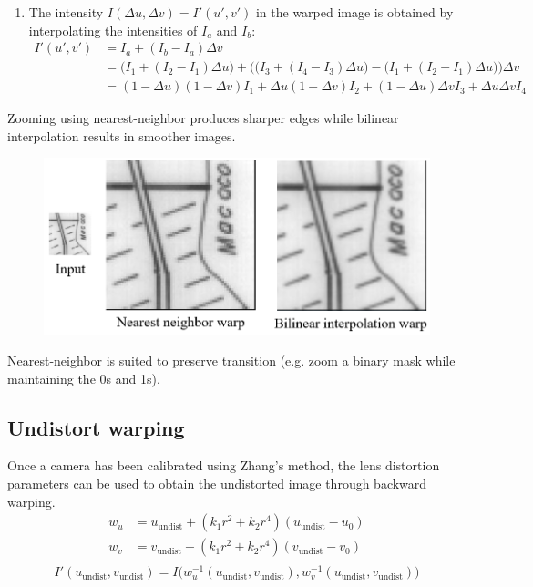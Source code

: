 \begin{description}
\begin{enumerate}
            \item The intensity $I(\Delta u, \Delta v) = I'(u', v')$ in the warped image is obtained by interpolating the intensities of $I_a$ and $I_b$:
                \[ 
                    \begin{split}
                        I'(u', v') &= I_a + (I_b - I_a) \Delta v \\
                        &= \Big( I_1 + (I_2 - I_1) \Delta u \Big) + \Big( \big( I_3 + (I_4 - I_3) \Delta u \big) - \big( I_1 + (I_2 - I_1) \Delta u \big) \Big) \Delta v \\
                        &= (1-\Delta u)(1 - \Delta v) I_1 + \Delta u (1-\Delta v) I_2 + (1-\Delta u) \Delta v I_3 + \Delta u \Delta v I_4
                    \end{split}
                \]
        \end{enumerate}

        \begin{remark}[Zoom]
            Zooming using nearest-neighbor produces sharper edges while bilinear interpolation results in smoother images.
            \begin{figure}[H]
                \centering
                \includegraphics[width=0.5\linewidth]{./img/warp_zoom.png}
            \end{figure}
        \end{remark}

        \begin{remark}
            Nearest-neighbor is suited to preserve transition (e.g. zoom a binary mask while maintaining the 0s and 1s).
        \end{remark}
\end{description}


\subsection{Undistort warping}

Once a camera has been calibrated using Zhang's method, the lens distortion parameters can be used to obtain the undistorted image through backward warping.
\[
    \begin{split}
        w_u &= u_\text{undist} + (k_1 r^2 + k_2 r^4)(u_\text{undist} - u_0) \\
        w_v &= v_\text{undist} + (k_1 r^2 + k_2 r^4)(v_\text{undist} - v_0) \\
    \end{split}
\]
\[
    I'(u_\text{undist}, v_\text{undist}) = I\big( w^{-1}_u(u_\text{undist}, v_\text{undist}), w^{-1}_v(u_\text{undist}, v_\text{undist}) \big)
\]

